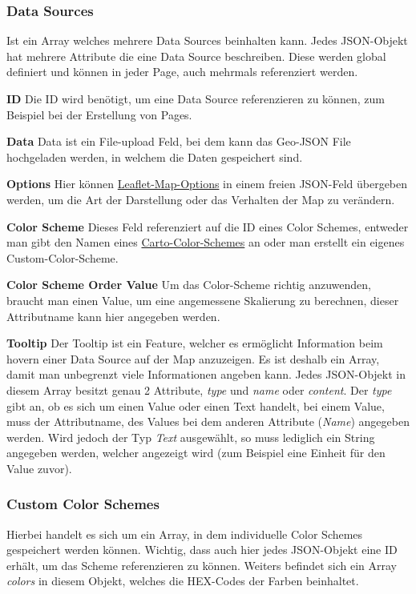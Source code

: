 \subsubsection{Data Sources}
Ist ein Array welches mehrere Data Sources beinhalten kann.
Jedes JSON-Objekt hat mehrere Attribute die eine Data Source beschreiben.
Diese werden global definiert und können in jeder Page, auch mehrmals referenziert werden.

\textbf{ID}
Die ID wird benötigt, um eine Data Source referenzieren zu können, zum Beispiel bei der Erstellung von Pages.

\textbf{Data}
Data ist ein File-upload Feld, bei dem kann das Geo-JSON File hochgeladen werden, in welchem die Daten gespeichert sind.

\textbf{Options}
Hier können \href{https://leafletjs.com/SlavaUkraini/reference.html#map-option}{Leaflet-Map-Options} in einem freien JSON-Feld
übergeben werden, um die Art der Darstellung oder das Verhalten der Map zu verändern.

\textbf{Color Scheme}
Dieses Feld referenziert auf die ID eines Color Schemes, entweder man gibt den Namen eines
\href{https://carto.com/carto-colors/}{Carto-Color-Schemes} an oder man erstellt ein eigenes Custom-Color-Scheme.

\textbf{Color Scheme Order Value}
Um das Color-Scheme richtig anzuwenden, braucht man einen Value, um eine angemessene Skalierung zu berechnen, dieser Attributname
kann hier angegeben werden.

\textbf{Tooltip}
Der Tooltip ist ein Feature, welcher es ermöglicht Information beim hovern einer Data Source auf der Map anzuzeigen.
Es ist deshalb ein Array, damit man unbegrenzt viele Informationen angeben kann.
Jedes JSON-Objekt in diesem Array besitzt genau 2 Attribute, \emph{type} und \emph{name} oder \emph{content}.
Der \emph{type} gibt an, ob es sich um einen Value oder einen Text handelt, bei einem Value, muss der Attributname, des
Values bei dem anderen Attribute (\emph{Name}) angegeben werden.
Wird jedoch der Typ \emph{Text} ausgewählt, so muss lediglich ein String angegeben werden, welcher angezeigt wird (zum Beispiel
eine Einheit für den Value zuvor).

\subsubsection{Custom Color Schemes}
Hierbei handelt es sich um ein Array, in dem individuelle Color Schemes gespeichert werden können.
Wichtig, dass auch hier jedes JSON-Objekt eine ID erhält, um das Scheme referenzieren zu können.
Weiters befindet sich ein Array \emph{colors} in diesem Objekt, welches die HEX-Codes der Farben beinhaltet.

